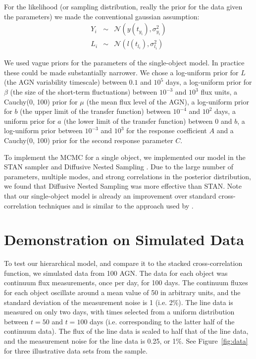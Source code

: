 \documentclass[useAMS,usenatbib]{mn2e}
\begin{document}
For the likelihood (or sampling distribution, really the prior for the data
given the parameters) we made the conventional gaussian assumption:
\begin{eqnarray}
Y_i &\sim& \mathcal{N}\left(y(t_{y_i}), \sigma_{y_i}^2\right)\\
L_i &\sim& \mathcal{N}\left(l(t_{l_i}), \sigma_{l_i}^2\right)
\end{eqnarray}

We used vague priors for the parameters of the single-object model. In practice
these could be made substantially narrower.
We chose a log-uniform prior for $L$ (the AGN variability timescale)
between $0.1$ and $10^5$ days, a log-uniform
prior for $\beta$ (the size of the short-term fluctuations)
between $10^{-3}$ and $10^3$ flux units, a Cauchy(0, 100)
prior for $\mu$ (the mean flux level of the AGN), a log-uniform prior for $b$
(the upper limit of the transfer function) between $10^{-4}$ and $10^2$ days,
a uniform prior for $a$ (the lower limit of the transfer function)
between 0 and $b$, a log-uniform prior between
$10^{-3}$ and $10^3$ for the response coefficient $A$ and a Cauchy(0, 100) prior
for the second response parameter $C$.

To implement the MCMC for a single object,
we implemented our model in the STAN sampler \citep{nuts}
and Diffusive Nested Sampling \citep{dnest}. Due to the large number of
parameters, multiple modes, and strong correlations in the posterior distribution,
we found that Diffusive Nested Sampling was more effective than STAN.
Note that our single-object model is already an improvement over standard
cross-correlation techniques and is similar to the approach used by
\citep{2011ApJ...735...80Z}.

\section{Demonstration on Simulated Data}\label{sec:data}
To test our hierarchical model, and compare it to the stacked cross-correlation
function, we simulated data from 100 AGN. The data for each object was
continuum flux measurements, once per day, for 100 days. The continuum fluxes
for each object oscillate around a mean value of 50 in arbitrary units, and the
standard deviation of the measurement noise is 1 (i.e. 2\%). The line data is measured on
only two days, with times selected from a uniform distribution between $t=50$
and $t=100$ days (i.e. corresponding to the latter half of the continuum data).
The flux of the line data is scaled to half that of the line data, and the
measurement noise for the line data is 0.25, or 1\%. See Figure~\ref{fig:data}
for three illustrative data sets from the sample.
\end{document}
